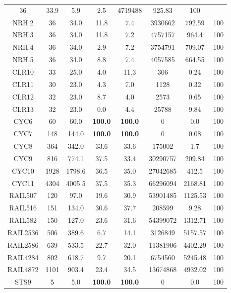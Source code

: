 \begin{longtable}{@{\extracolsep{5pt}}cccccccc}
		36 & 33.9 &
			5.9
		&
			2.5
		& 4719488 & 925.83 & 100
	\\
	NRH.2 &
		36 & 34.0 &
			11.8
		&
			7.4
		& 3930662 & 792.59 & 100
	\\
	NRH.3 &
		36 & 34.0 &
			11.8
		&
			7.2
		& 4757157 & 964.4 & 100
	\\
	NRH.4 &
		36 & 34.0 &
			2.9
		&
			7.2
		& 3754791 & 709.07 & 100
	\\
	NRH.5 &
		36 & 34.0 &
			8.8
		&
			7.4
		& 4057585 & 664.55 & 100
	\\
	CLR10 &
		33 & 25.0 &
			4.0
		&
			11.3
		& 306 & 0.24 & 100
	\\
	CLR11 &
		30 & 23.0 &
			4.3
		&
			7.0
		& 1128 & 0.32 & 100
	\\
	CLR12 &
		32 & 23.0 &
			8.7
		&
			4.0
		& 2573 & 0.65 & 100
	\\
	CLR13 &
		32 & 23.0 &
			0.0
		&
			4.4
		& 25788 & 9.84 & 100
	\\
	CYC6 &
		60 & 60.0 &
			\textbf{100.0}
		&
			\textbf{100.0}
		& 0 & 0.0 & 100
	\\
	CYC7 &
		148 & 144.0 &
			\textbf{100.0}
		&
			\textbf{100.0}
		& 0 & 0.08 & 100
	\\
	CYC8 &
		364 & 342.0 &
			33.6
		&
			33.6
		& 175002 & 1.7 & 100
	\\
	CYC9 &
		816 & 774.1 &
			37.5
		&
			33.4
		& 30290757 & 209.84 & 100
	\\
	CYC10 &
		1928 & 1798.6 &
			36.5
		&
			35.0
		& 27042685 & 412.5 & 100
	\\
	CYC11 &
		4304 & 4005.5 &
			37.5
		&
			35.3
		& 66296094 & 2168.81 & 100
	\\
	RAIL507 &
		120 & 97.0 &
			19.6
		&
			30.9
		& 53901485 & 1125.53 & 100
	\\
	RAIL516 &
		151 & 134.0 &
			30.6
		&
			37.7
		& 208599 & 9.28 & 100
	\\
	RAIL582 &
		150 & 127.0 &
			23.6
		&
			31.6
		& 54399072 & 1312.71 & 100
	\\
	RAIL2536 &
		506 & 389.6 &
			6.7
		&
			14.1
		& 3126849 & 5157.57 & 100
	\\
	RAIL2586 &
		639 & 533.5 &
			22.7
		&
			32.0
		& 11381906 & 4402.29 & 100
	\\
	RAIL4284 &
		802 & 618.7 &
			9.7
		&
			20.1
		& 6754560 & 5245.48 & 100
	\\
	RAIL4872 &
		1101 & 903.4 &
			23.4
		&
			34.5
		& 13674868 & 4932.02 & 100
	\\
	STS9 &
		5 & 5.0 &
			\textbf{100.0}
		&
			\textbf{100.0}
		& 0 & 0.0 & 100

\end{longtable}
